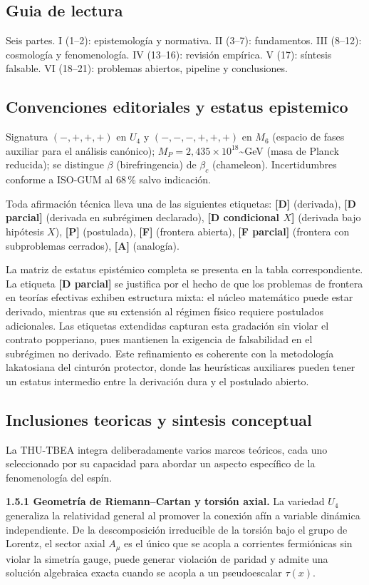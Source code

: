 ﻿\documentclass[11pt,letterpaper]{article}
\begin{document}
\subsection{Guia de lectura}
Seis partes. I (1--2): epistemología y normativa. II (3--7): fundamentos. III (8--12): cosmología y fenomenología. IV (13--16): revisión empírica. V (17): síntesis falsable. VI (18--21): problemas abiertos, pipeline y conclusiones.
\subsection{Convenciones editoriales y estatus epistemico}
Signatura $(-,+,+,+)$ en $U_4$ y $(-,-,-,+,+,+)$ en $M_6$ (espacio de fases auxiliar para el análisis canónico); $M_P = 2{,}435 \times 10^{18}$\textasciitilde{}GeV (masa de Planck reducida); se distingue $\beta$ (birefringencia) de $\beta_c$ (chameleon). Incertidumbres conforme a ISO-GUM al 68\,\% salvo indicación.

Toda afirmación técnica lleva una de las siguientes etiquetas: \textbf{[D]} (derivada), \textbf{[D parcial]} (derivada en subrégimen declarado), \textbf{[D condicional $X$]} (derivada bajo hipótesis $X$), \textbf{[P]} (postulada), \textbf{[F]} (frontera abierta), \textbf{[F parcial]} (frontera con subproblemas cerrados), \textbf{[A]} (analogía).

La matriz de estatus epistémico completa se presenta en la tabla correspondiente. La etiqueta \textbf{[D parcial]} se justifica por el hecho de que los problemas de frontera en teorías efectivas exhiben estructura mixta: el núcleo matemático puede estar derivado, mientras que su extensión al régimen físico requiere postulados adicionales. Las etiquetas extendidas capturan esta gradación sin violar el contrato popperiano, pues mantienen la exigencia de falsabilidad en el subrégimen no derivado. Este refinamiento es coherente con la metodología lakatosiana del cinturón protector, donde las heurísticas auxiliares pueden tener un estatus intermedio entre la derivación dura y el postulado abierto.
\subsection{Inclusiones teoricas y sintesis conceptual}
La THU-TBEA integra deliberadamente varios marcos teóricos, cada uno seleccionado por su capacidad para abordar un aspecto específico de la fenomenología del espín.

\textbf{1.5.1 Geometría de Riemann--Cartan y torsión axial.} La variedad $U_4$ generaliza la relatividad general al promover la conexión afín a variable dinámica independiente. De la descomposición irreducible de la torsión bajo el grupo de Lorentz, el sector axial $A_\mu$ es el único que se acopla a corrientes fermiónicas sin violar la simetría gauge, puede generar violación de paridad y admite una solución algebraica exacta cuando se acopla a un pseudoescalar $\tau(x)$.
\end{document}
